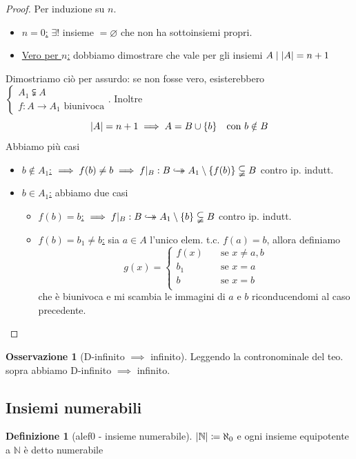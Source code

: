 \documentclass[a4paper,10pt]{article}
\theoremstyle{definition}
\newcommand{\na}{\mathbb{N}} %
\newcommand{\hookdoubleheadrightarrow}{\hookrightarrow\mathrel{\mspace{-15mu}}\rightarrow}
\newcommand{\bij}{\hookdoubleheadrightarrow} %
\theoremstyle{indentdefinition}
\newtheorem{defn}{Definizione}[section]
\theoremstyle{indentpostulate}
\theoremstyle{indenttheorem}
\theoremstyle{myremark}
\newtheorem*{rem*}{Osservazione}
\theoremstyle{indentgeneral}
\begin{document}
\begin{proof} Per induzione su $n$.
\begin{itemize}
    \item \underline{$n=0$:} $\exists!$ insieme $=\varnothing$ che non ha sottoinsiemi propri.
    \item \underline{Vero per $n$:} dobbiamo dimostrare che vale per gli insiemi $A\mid \abs{A}=n+1$ 
\end{itemize}
Dimostriamo ciò per assurdo: se non fosse vero, esisterebbero $\begin{cases}
    A_1\subsetneqq A\\
    f:A\to A_1\text{ biunivoca}
\end{cases}$. Inoltre 
$$\abs{A}=n+1\implies A=B\cup\{b\}\quad \text{con }b\notin B$$
Abbiamo più casi
\begin{itemize}
    \item \underline{$b \notin A_1$:} $\implies f(b)\ne b\implies f|_B:B\bij A_1\setminus\{f(b)\}\subsetneqq B$ contro ip.  indutt. \lightning
    \item \underline{$b \in A_1$:} abbiamo due casi
    \begin{itemize}
        \item \underline{$f(b)=b$:} $\implies f|_B:B\bij A_1\setminus\{b\}\subsetneqq B$ contro ip.  indutt. \lightning
        \item \underline{$f(b)=b_1\neq b$:} sia $a\in A$ l'unico elem. t.c. $f(a)=b$, allora definiamo
        $$g(x)=\begin{cases}
            f(x) \quad & \text{se } x\ne a,b\\
            b_1 \quad & \text{se } x=a\\
            b \quad & \text{se } x=b\\
        \end{cases}$$
        che è biunivoca e mi scambia le immagini di $a$ e $b$ riconducendomi al caso precedente.
    \end{itemize}
\end{itemize}
\end{proof}

\begin{rem*}[D-infinito $\implies$ infinito]\label{thm-d-inf-inf}
    Leggendo la contronominale del teo. sopra abbiamo D-infinito $\implies$ infinito.
\end{rem*}

\subsection{Insiemi numerabili}
\begin{defn}[alef0 - insieme numerabile] $\abs{\na}\coloneqq\aleph_0$ e ogni insieme equipotente a $\na$ è detto numerabile 
\end{defn}
\end{document}
